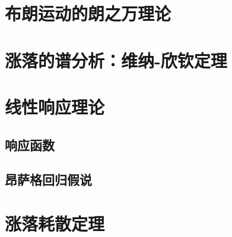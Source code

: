 \section{布朗运动的朗之万理论}

\section{涨落的谱分析：维纳-欣钦定理}

\section{线性响应理论}

\subsection{响应函数}

\subsection{昂萨格回归假说}

\section{涨落耗散定理}
